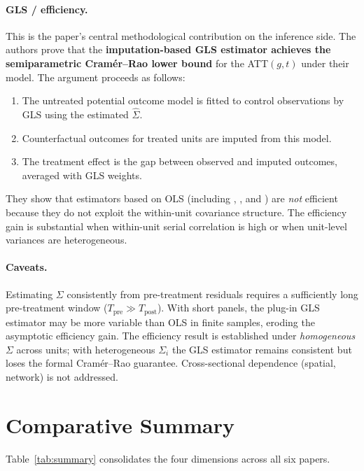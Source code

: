 \documentclass[12pt]{article}
\begin{document}
\paragraph{GLS / efficiency.}
This is the paper's central methodological contribution on the inference side.
The authors prove that the \textbf{imputation-based GLS estimator achieves the
semiparametric Cram\'{e}r--Rao lower bound} for the ATT$(g,t)$ under their model.
The argument proceeds as follows:
\begin{enumerate}
  \item The untreated potential outcome model is fitted to control observations
        by GLS using the estimated $\hat{\Sigma}$.
  \item Counterfactual outcomes for treated units are imputed from this model.
  \item The treatment effect is the gap between observed and imputed outcomes,
        averaged with GLS weights.
\end{enumerate}
They show that estimators based on OLS (including
\citealt{callaway2021difference},
\citealt{sun2021estimating}, and
\citealt{gardner2024twostage})
are \textit{not} efficient because they do not exploit the within-unit
covariance structure.
The efficiency gain is substantial when within-unit serial correlation is high
or when unit-level variances are heterogeneous.

\paragraph{Caveats.}
Estimating $\Sigma$ consistently from pre-treatment residuals requires a
sufficiently long pre-treatment window ($T_{\text{pre}} \gg T_{\text{post}}$).
With short panels, the plug-in GLS estimator may be more variable than OLS
in finite samples, eroding the asymptotic efficiency gain.
The efficiency result is established under \textit{homogeneous} $\Sigma$ across
units; with heterogeneous $\Sigma_i$ the GLS estimator remains consistent but
loses the formal Cram\'{e}r--Rao guarantee.
Cross-sectional dependence (spatial, network) is not addressed.

\section{Comparative Summary}

Table~\ref{tab:summary} consolidates the four dimensions across all six papers.
\end{document}
